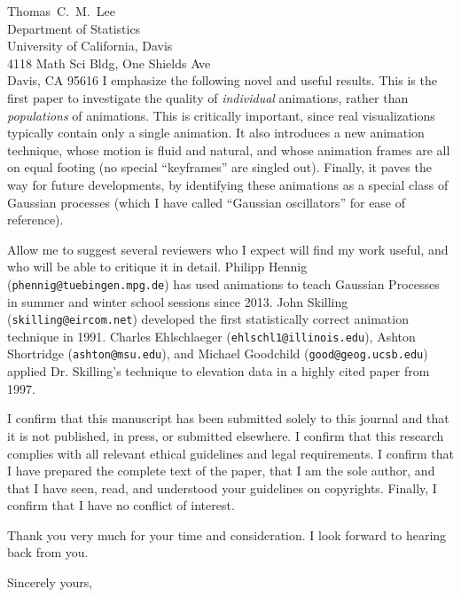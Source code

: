 \documentclass[11pt]{letter} %
\begin{document}
\begin{letter}{%
    Thomas~C.~M.~Lee \\
    Department of Statistics \\
    University of California, Davis  \\
    4118 Math Sci Bldg, One Shields Ave  \\
    Davis, CA 95616
}
I emphasize the following novel and useful results.
This is the first paper to investigate the quality of \textit{individual} animations, rather than \textit{populations} of animations.
This is critically important, since real visualizations typically contain only a single animation.
It also introduces a new animation technique, whose motion is fluid and natural, and whose animation frames are all on equal footing (no special ``keyframes'' are singled out).
Finally, it paves the way for future developments, by identifying these animations as a special class of Gaussian processes (which I have called ``Gaussian oscillators'' for ease of reference).

Allow me to suggest several reviewers who I expect will find my work useful, and who will be able to critique it in detail.
Philipp Hennig (\texttt{phennig@tuebingen.mpg.de}) has used animations to teach Gaussian Processes in summer and winter school sessions since 2013.
John Skilling (\texttt{skilling@eircom.net}) developed the first statistically correct animation technique in 1991.
Charles Ehlschlaeger (\texttt{ehlschl1@illinois.edu}), Ashton Shortridge (\texttt{ashton@msu.edu}), and Michael Goodchild (\texttt{good@geog.ucsb.edu}) applied Dr. Skilling's technique to elevation data in a highly cited paper from 1997.

I confirm that this manuscript has been submitted solely to this journal and that it is not published, in press, or submitted elsewhere.
I confirm that this research complies with all relevant ethical guidelines and legal requirements.
I confirm that I have prepared the complete text of the paper, that I am the sole author, and that I have seen, read, and understood your guidelines on copyrights.
Finally, I confirm that I have no conflict of interest.

Thank you very much for your time and consideration.
I look forward to hearing back from you.

\closing{Sincerely yours,}




\end{letter}
\end{document}
